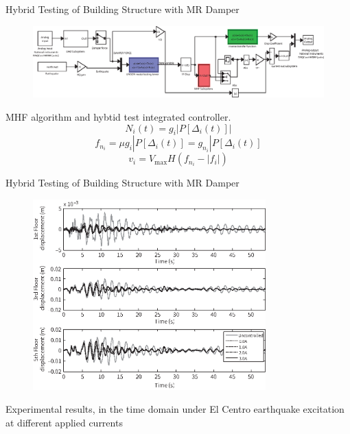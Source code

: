 \documentclass[usepdftitle=false]{beamer}
\begin{document}
\begin{frame}{Hybrid Testing of Building Structure with MR Damper}
\begin{figure}[H]
\centering
\includegraphics[width=1\textwidth] {figure/8-15.eps}
\label{fig:8-15}
\end{figure}
MHF algorithm and hybtid test integrated controller.
\begin{equation}\label{eq:8-22}
N_{i}(t)=g_{i}|P\left[\Delta_{i}(t)\right]|
\end{equation}
\begin{equation}\label{eq:8-23}
f_{n_{i}}=\mu g_{i}|P\left[\Delta_{i}(t)\right]=g_{n_{i}}|P\left[\Delta_{i}(t)\right]
\end{equation}
\begin{equation}\label{eq:8-24}
v_{i} = V_{\text{max}}H\left(f_{n_{i}}-|f_{i}|\right)
\end{equation}
\end{frame}

\begin{frame}{Hybrid Testing of Building Structure with MR Damper}
\begin{figure}[H]
\centering
\includegraphics[width=0.8\textwidth] {figure/8-16.eps}
\label{fig:8-16}
\end{figure}
Experimental results, in the time domain under El Centro earthquake excitation at different applied currents
\end{frame}
\end{document}
